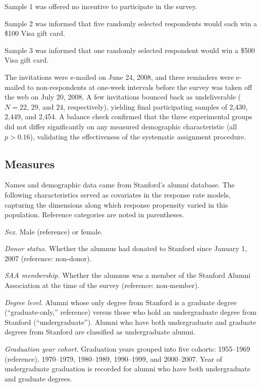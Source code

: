 \bci
\item Sample 1 was offered no incentive to participate in the survey.
\item Sample 2 was informed that five randomly selected respondents would each win a
  \$100 Visa gift card.
\item Sample 3 was informed that one randomly selected respondent would win a \$500 Visa
  gift card.
\eci

The invitations were e-mailed on June 24, 2008, and three reminders were e-mailed to
non-respondents at one-week intervals before the survey was taken off the web on July 20,
2008. A few invitations bounced back as undeliverable ($N = 22$, $29$, and $24$,
respectively), yielding final participating samples of 2,430, 2,449, and 2,454. A
balance check confirmed that the three experimental groups did not differ significantly
on any measured demographic characteristic (all $p > 0.16$), validating the
effectiveness of the systematic assignment procedure.

\subsection{Measures}

Names and demographic data came from Stanford's alumni database. The following
characteristics served as covariates in the response rate models, capturing the
dimensions along which response propensity varied in this population. Reference
categories are noted in parentheses.

\emph{Sex.} Male (reference) or female.

\emph{Donor status.} Whether the alumnus had donated to Stanford since January 1, 2007
(reference: non-donor).

\emph{SAA membership.} Whether the alumnus was a member of the Stanford Alumni
Association at the time of the survey (reference: non-member).

\emph{Degree level.} Alumni whose only degree from Stanford is a graduate degree
(``graduate-only,'' reference) versus those who hold an undergraduate degree from
Stanford (``undergraduate''). Alumni who have both undergraduate and graduate degrees
from Stanford are classified as undergraduate alumni.

\emph{Graduation year cohort.} Graduation years grouped into five cohorts: 1955--1969
(reference), 1970--1979, 1980--1989, 1990--1999, and 2000--2007. Year of undergraduate
graduation is recorded for alumni who have both undergraduate and graduate degrees.


